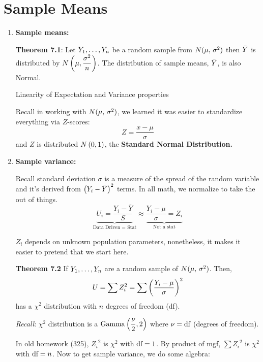 \section{Sample Means}

\begin{enumerate}[label=\textcircled{\raisebox{-1pt}{\arabic*}}]
    \item \textbf{Sample means: }

    \nl\textbf{Theorem 7.1}: Let $Y_1, \dots, Y_n$ be a random sample from $\normalDist*$ then $\bar{Y}$ is distributed by $\normalDist{\mu}{\dfrac{\sigma^2}{n}}$. The distribution of sample means, $\bar{Y}$, is also Normal.

    \reason* Linearity of Expectation and Variance properties 

    \disc* Recall in working with $\normalDist*$, we learned it was easier to standardize\\everything via
        $Z$-scores: $$Z = \frac{x-\mu}{\sigma}$$
        and $Z$ is distributed $\normalDist{0}{1}$, the \textbf{Standard Normal Distribution.}
        
        
    \item
        \textbf{Sample variance:}
        
        \nl Recall standard deviation $\sigma$ is a measure of the spread of the random variable and it's derived from $\pars{Y_i - \Ybar}^2$ terms. In all math, we normalize to take the  out of things.
        $$\underbrace{U_i = \frac{Y_i - \bar{Y}}{S}}_{\text{Data Driven = Stat}} \approx \underbrace{\frac{Y_i - \mu}{\sigma} = Z_i}_{\text{Not a stat}}$$
        
        \reason* $Z_i$ depends on unknown population parameters, nonetheless, it makes it easier to pretend that we start here.

        \nnl
        \textbf{Theorem 7.2} If $Y_1, \dots, Y_n$ are a random sample of $\normalDist*$. Then,
        $$U = \sum Z_i^2 = \sum \pars{\frac{Y_i - \mu}{\sigma}}^2$$
        has a $\chi^2$ distribution with $n$ degrees of freedom (df).

        \nl
        \textit{Recall}: $\chi^2$ distribution is a $\operatorname{Gamma} \left( {\dfrac{\nu}{2}},{2} \right)$ where $\nu = \text{df}$ (degrees of freedom).

        \reason In old homework (325), ${Z_i}^2$ is $\chi^2$ with $\text{df} = 1$.
        By product of mgf, $\sum {Z_i}^2$ is $\chi^2$ with $\text{df} = n$. Now to get sample variance, we do some algebra:


\end{enumerate}
